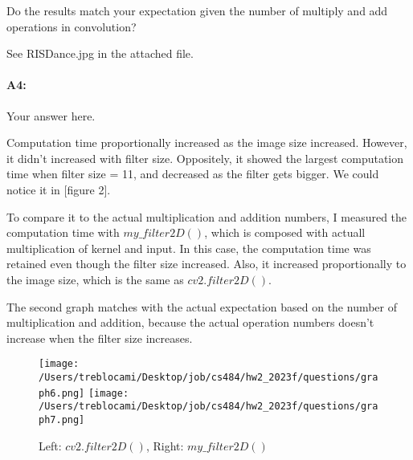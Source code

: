 	Do the results match your expectation given the number of multiply and add operations in convolution?
	
	See RISDance.jpg in the attached file.
	
	\paragraph{A4:} Your answer here.

	Computation time proportionally increased as the image size increased. However, it didn't increased with filter size.
	Oppositely, it showed the largest computation time when filter size = 11, and decreased as the filter gets bigger. We could notice it in [figure 2].

	To compare it to the actual multiplication and addition numbers, I measured the computation time with $my\_filter2D()$, which is composed with actuall multiplication of kernel and input.
	In this case, the computation time was retained even though the filter size increased. Also, it increased proportionally to the image size, which is the same as $cv2.filter2D()$.

	The second graph matches with the actual expectation based on the number of multiplication and addition, because the actual operation numbers doesn't increase when the filter size increases.

	\begin{figure*}[b]
	\centering
	\texttt{[image: /Users/treblocami/Desktop/job/cs484/hw2\_2023f/questions/graph6.png]}
	\texttt{[image: /Users/treblocami/Desktop/job/cs484/hw2\_2023f/questions/graph7.png]}
	\caption{Left: $cv2.filter2D()$, Right: $my\_filter2D()$}
	\end{figure*}
	
	
	
	
	
